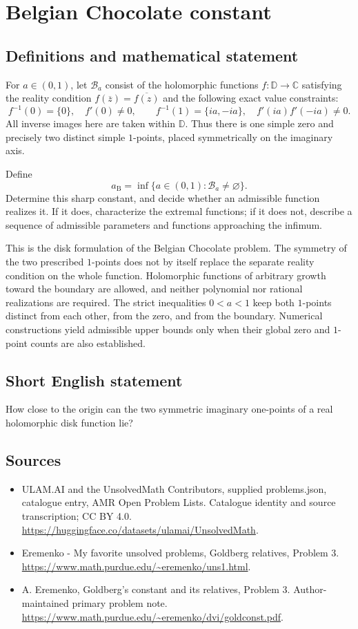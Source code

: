 \documentclass[11pt,a4paper]{article}
\begin{document}
\section*{Belgian Chocolate constant}\label{statement}

\subsection{Definitions and mathematical statement}
For $a\in(0,1)$, let $\mathcal B_a$ consist of the
holomorphic functions $f:\mathbb D\to\mathbb C$ satisfying
the reality condition
$f(\overline z)=\overline{f(z)}$ and the following exact
value constraints:
\[
 f^{-1}(0)=\{0\},\quad f'(0)\ne0,\qquad
 f^{-1}(1)=\{ia,-ia\},\quad
 f'(ia)f'(-ia)\ne0.
\]
All inverse images here are taken within $\mathbb D$.
Thus there is one simple zero and precisely two
distinct simple $1$-points, placed symmetrically on
the imaginary axis.

Define
\[
                 a_{\mathrm B}=
                    \inf\{a\in(0,1):\mathcal B_a\ne\varnothing\}.
\]
Determine this sharp constant, and decide whether an
admissible function realizes it. If it does, characterize
the extremal functions; if it does not, describe a
sequence of admissible parameters and functions approaching
the infimum.

This is the disk formulation of the Belgian Chocolate
problem. The symmetry of the two prescribed $1$-points
does not by itself replace the separate reality condition
on the whole function. Holomorphic functions of arbitrary
growth toward the boundary are allowed, and neither
polynomial nor rational realizations are required.
The strict inequalities $0<a<1$ keep both $1$-points
distinct from each other, from the zero, and from the
boundary. Numerical constructions yield admissible upper
bounds only when their global zero and $1$-point
counts are also established.
\subsection{Short English statement}
How close to the origin can the two symmetric imaginary one-points of a real holomorphic disk function lie?
\subsection{Sources}
\begin{itemize}
\item[S1] ULAM.AI and the UnsolvedMath Contributors, supplied problems.json, catalogue entry, AMR Open Problem Lists. Catalogue identity and source transcription; CC BY 4.0.
\url{https://huggingface.co/datasets/ulamai/UnsolvedMath}.
\item[S2] Eremenko - My favorite unsolved problems, Goldberg relatives, Problem 3. 
\url{https://www.math.purdue.edu/~eremenko/uns1.html}.
\item[S3] A. Eremenko, Goldberg's constant and its relatives, Problem 3. Author-maintained primary problem note.
\url{https://www.math.purdue.edu/~eremenko/dvi/goldconst.pdf}.
\end{itemize}
\end{document}
